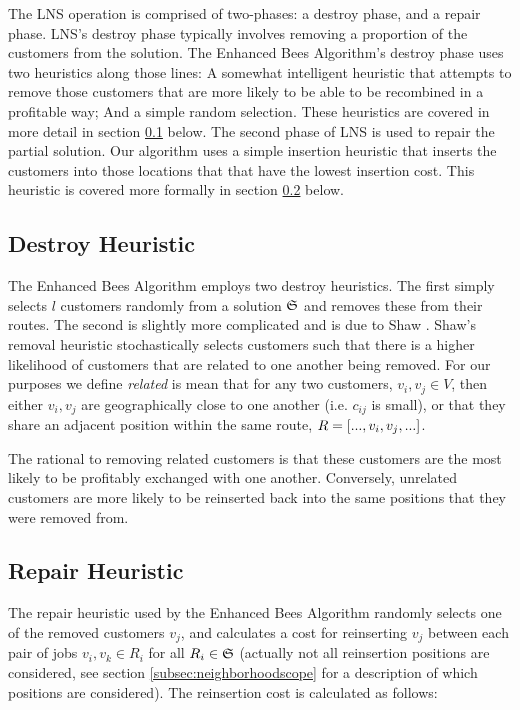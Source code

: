 The LNS operation is comprised of two-phases: a destroy phase, and a repair phase. LNS's destroy phase typically involves removing a proportion of the customers from the solution. The Enhanced Bees Algorithm's destroy phase uses two heuristics along those lines: A somewhat intelligent heuristic that attempts to remove those customers that are more likely to be able to be recombined in a profitable way; And a simple random selection. These heuristics are covered in more detail in section \ref{subsec:destroyheuristic} below. The second phase of LNS is used to repair the partial solution. Our algorithm uses a simple insertion heuristic that inserts the customers into those locations that that have the lowest insertion cost. This heuristic is covered more formally in section \ref{subsec:repairheuristic} below.

\subsection{Destroy Heuristic}
\label{subsec:destroyheuristic}

The Enhanced Bees Algorithm employs two destroy heuristics. The first simply selects $l$ customers randomly from a solution $\mathfrak{S}$ and removes these from their routes. The second is slightly more complicated and is due to Shaw \cite{Shaw:1998}. Shaw's removal heuristic stochastically selects customers such that there is a higher likelihood of customers that are related to one another being removed. For our purposes we define \emph{related} is mean that for any two customers, $v_i, v_j \in V$, then either $v_i, v_j$ are geographically close to one another (i.e. $c_{ij}$ is small), or that they share an adjacent position within the same route, $R = [..., v_i, v_j, ...]$.

The rational to removing related customers is that these customers are the most likely to be profitably exchanged with one another. Conversely, unrelated customers are more likely to be reinserted back into the same positions that they were removed from. 

\subsection{Repair Heuristic}
\label{subsec:repairheuristic}

The repair heuristic used by the Enhanced Bees Algorithm randomly selects one of the removed customers $v_j$, and calculates a cost for reinserting $v_j$ between each pair of jobs $v_i, v_k \in R_i$ for all $R_i \in \mathfrak{S}$ (actually not all reinsertion positions are considered, see section \ref{subsec:neighborhoodscope} for a description of which positions are considered). The reinsertion cost is calculated as follows:

